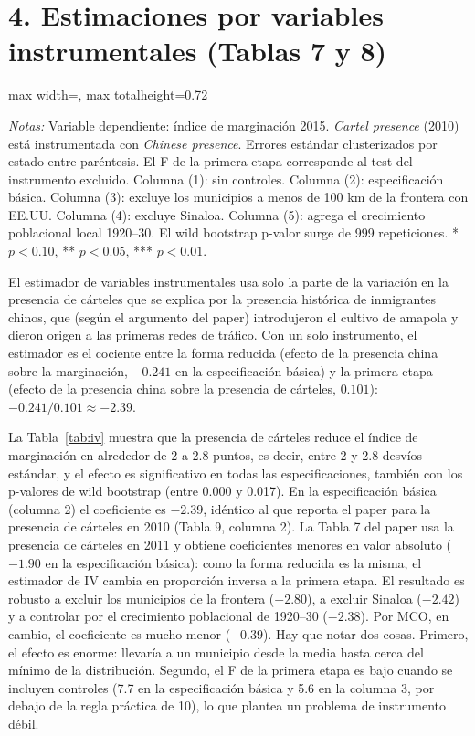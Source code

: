 \documentclass[11pt,a4paper]{article}
\newcommand{\tabla}[1]{\begin{adjustbox}{max width=\linewidth, max totalheight=0.72\textheight}\end{adjustbox}}
\newcommand{\notas}[1]{\par\vspace{0.3em}\begin{minipage}{0.92\linewidth}\footnotesize\textit{Notas:} #1\end{minipage}}
\begin{document}
\section*{4. Estimaciones por variables instrumentales (Tablas 7 y 8)}

\begin{table}[H]\centering
\caption{Presencia de cárteles y marginación (2SLS)}\label{tab:iv}
\small
\tabla{"../output/Tabla 3.tex"}
\notas{Variable dependiente: índice de marginación 2015. \textit{Cartel presence} (2010) está instrumentada con \textit{Chinese presence}. Errores estándar clusterizados por estado entre paréntesis. El F de la primera etapa corresponde al test del instrumento excluido. Columna (1): sin controles. Columna (2): especificación básica. Columna (3): excluye los municipios a menos de 100 km de la frontera con EE.UU. Columna (4): excluye Sinaloa. Columna (5): agrega el crecimiento poblacional local 1920--30. El wild bootstrap p-valor surge de 999 repeticiones. * $p<0.10$, ** $p<0.05$, *** $p<0.01$.}
\end{table}

El estimador de variables instrumentales usa solo la parte de la variación en la presencia de cárteles que se explica por la presencia histórica de inmigrantes chinos, que (según el argumento del paper) introdujeron el cultivo de amapola y dieron origen a las primeras redes de tráfico. Con un solo instrumento, el estimador es el cociente entre la forma reducida (efecto de la presencia china sobre la marginación, $-0.241$ en la especificación básica) y la primera etapa (efecto de la presencia china sobre la presencia de cárteles, $0.101$): $-0.241/0.101\approx-2.39$.

La Tabla~\ref{tab:iv} muestra que la presencia de cárteles reduce el índice de marginación en alrededor de 2 a 2.8 puntos, es decir, entre 2 y 2.8 desvíos estándar, y el efecto es significativo en todas las especificaciones, también con los p-valores de wild bootstrap (entre 0.000 y 0.017). En la especificación básica (columna 2) el coeficiente es $-2.39$, idéntico al que reporta el paper para la presencia de cárteles en 2010 (Tabla 9, columna 2). La Tabla 7 del paper usa la presencia de cárteles en 2011 y obtiene coeficientes menores en valor absoluto ($-1.90$ en la especificación básica): como la forma reducida es la misma, el estimador de IV cambia en proporción inversa a la primera etapa. El resultado es robusto a excluir los municipios de la frontera ($-2.80$), a excluir Sinaloa ($-2.42$) y a controlar por el crecimiento poblacional de 1920--30 ($-2.38$). Por MCO, en cambio, el coeficiente es mucho menor ($-0.39$). Hay que notar dos cosas. Primero, el efecto es enorme: llevaría a un municipio desde la media hasta cerca del mínimo de la distribución. Segundo, el F de la primera etapa es bajo cuando se incluyen controles (7.7 en la especificación básica y 5.6 en la columna 3, por debajo de la regla práctica de 10), lo que plantea un problema de instrumento débil.
\end{document}
